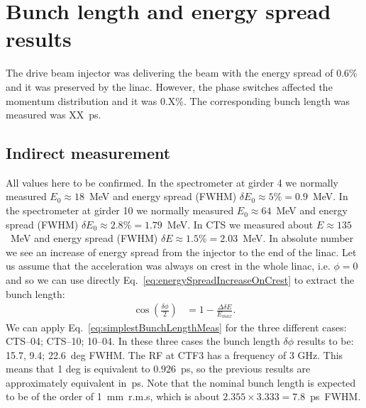 \section{Bunch length and energy spread results}

The drive beam injector was delivering the beam with the energy spread of 0.6\% 
and it was preserved by the linac. 
However, the phase switches affected the momentum distribution and it was 0.X\%.
The corresponding bunch length was measured was XX~ps.



\subsection{Indirect measurement}
{\color{red} All values here to be confirmed.}
In the spectrometer at girder 4 we normally measured $E_0\approx18$~MeV and 
energy spread (FWHM) $\delta E_0 \approx 5 \% = 0.9$~MeV.
In the spectrometer at girder 10 we normally measured $E_0\approx64$~MeV and 
energy spread (FWHM) $\delta E_0 \approx 2.8 \% = 1.79$~MeV.
In CTS we measured about $E \approx 135$~MeV and energy spread 
(FWHM) $\delta E \approx 1.5 \% = 2.03$~MeV.
%
In absolute number we see an increase of energy spread from the injector to the end of the linac.
Let us assume that the acceleration was always on crest in the whole linac, i.e. $\phi = 0$ and 
so we can use directly Eq.~\ref{eq:energySpreadIncreaseOnCrest} to extract the bunch length:
%
\begin{align}
\cos\left(\frac{\delta \phi}{2}\right) &= 1 - \frac{\Delta \delta E}{E_{max}}.
\label{eq:simplestBunchLengthMeas}
\end{align}
%
We can apply Eq.~\ref{eq:simplestBunchLengthMeas} for the three different cases: CTS--04; CTS--10; 10--04.
In these three cases the bunch length $\delta \phi$ results to be: 15.7, 9.4; 22.6~deg FWHM.
%
The RF at CTF3 has a frequency of 3 GHz. This means that 1 deg is equivalent to $0.926$~ps, 
so the previous results are approximately equivalent in~ps.
Note that the nominal bunch length is expected to be of the order of 1~mm~r.m.s, 
which is about $2.355 \times 3.333 = 7.8$~ps~FWHM.



